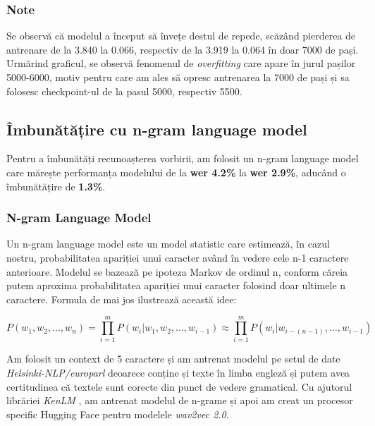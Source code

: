 \subsubsection{Note}
Se observă că modelul a început să învețe destul de repede, scăzând pierderea de antrenare
de la 3.840 la 0.066, respectiv de la 3.919 la 0.064 în doar 7000 de pași. Urmărind graficul,
se observă fenomenul de \textit{overfitting} care apare în jurul pașilor 5000-6000, motiv
pentru care am ales să opresc antrenarea la 7000 de pași și sa folosesc checkpoint-ul de
la pasul 5000, respectiv 5500.




\subsection{Îmbunătățire cu n-gram language model}
Pentru a îmbunătăți recunoașterea vorbirii, am folosit un n-gram language model care 
mărește performanța modelului de la \textbf{wer 4.2\%}  la \textbf{wer 2.9\%}, aducând
o îmbunătățire de \textbf{1.3\%}.

\subsubsection{N-gram Language Model}
Un n-gram language model este un model statistic care estimează, în cazul nostru, probabilitatea
apariției unui caracter având în vedere cele n-1 caractere anterioare. Modelul se bazează pe
ipoteza Markov de ordinul n, conform căreia putem aproxima probabilitatea apariției unui caracter
folosind doar ultimele n caractere. Formula de mai jos ilustrează această idee:

\begin{equation}
    P(w_1, w_2, \ldots, w_n) = \prod_{i=1}^{m} P(w_i | w_{1}, w_{2}, \ldots, w_{i-1}) \approx \prod_{i=1}^{m} P(w_i | w_{i-(n-1)}, \ldots, w_{i-1})
\end{equation}
\vspace{1em}

\par
Am folosit un context de 5 caractere și am antrenat modelul pe
setul de date \textit{Helsinki-NLP/europarl} \cite{tiedemann-2012-parallel} deoarece conține și
texte în limba engleză și putem avea certitudinea că textele sunt corecte din punct de vedere
gramatical. Cu ajutorul librăriei \textit{KenLM} \cite{heafield-2011-kenlm}, am antrenat modelul
de n-grame și apoi am creat un procesor specific Hugging Face pentru modelele \textit{wav2vec 2.0}.

